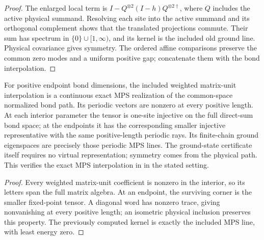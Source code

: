 \begin{proof}\leanok
    The enlarged local term is
    $I-Q^{\otimes2}(I-h)Q^{\otimes2\dagger}$, where $Q$ includes the active
    physical summand. Resolving each site into the active summand and its
    orthogonal complement shows that the translated projections commute.
    Their sum has spectrum in $\{0\}\cup[1,\infty)$, and its kernel is the
    included old ground line. Physical covariance gives symmetry.
    The ordered affine comparisons preserve the common zero modes and a
    uniform positive gap; concatenate them with the bond interpolation.
\end{proof}

\begin{lemma}
    \label{thm:spt_common_physical_fixed_point_ground_path}
    \leanok
    For positive endpoint bond dimensions, the included weighted
    matrix-unit interpolation is a continuous exact MPS realization of
    the common-space normalized bond path. Its periodic vectors are
    nonzero at every positive length. At each interior parameter the
    tensor is one-site injective on the full direct-sum bond space; at
    the endpoints it has the corresponding smaller injective
    representative with the same positive-length periodic rays.
    Its finite-chain ground eigenspaces are precisely those periodic
    MPS lines. The ground-state certificate itself requires no
    virtual representation; symmetry comes from the physical path.
    This verifies the exact MPS interpolation in
    \cite[Section~II.F.2]{Schuch2011Phases} in the stated setting.
\end{lemma}

\begin{proof}\leanok
    Every weighted matrix-unit coefficient is nonzero in the interior,
    so its letters span the full matrix algebra. At an endpoint, the
    surviving corner is the smaller fixed-point tensor. A diagonal word
    has nonzero trace, giving nonvanishing at every positive length;
    an isometric physical inclusion preserves this property.
    The previously computed kernel is exactly the included MPS line,
    with least energy zero.
\end{proof}

